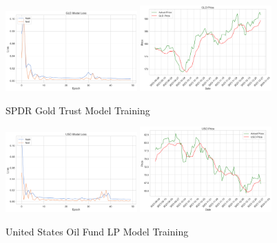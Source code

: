\documentclass{ledger}
\begin{document}
\begin{figure}[htbp]
    \centering
    \includegraphics[width=0.45\textwidth]{code/price-prediction/lstm/images/gld_loss.png} %
    \hspace{0.05\textwidth} %
    \includegraphics[width=0.45\textwidth]{code/price-prediction/lstm/images/gld_price.png} %
    \caption{SPDR Gold Trust Model Training}
    \label{fig:side_by_side}
\end{figure}

\begin{figure}[htbp]
    \centering
    \includegraphics[width=0.45\textwidth]{code/price-prediction/lstm/images/uso_loss.png} %
    \hspace{0.05\textwidth} %
    \includegraphics[width=0.45\textwidth]{code/price-prediction/lstm/images/uso_price.png} %
    \caption{United States Oil Fund LP Model Training}
    \label{fig:side_by_side}
\end{figure}
\end{document}
